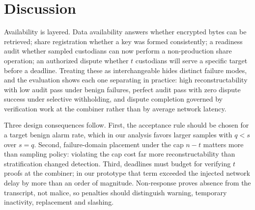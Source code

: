 \documentclass[10pt]{article}
\makeatletter
\newcommand{\FloatBarrier}{\par\begingroup\let\@elt\relax\edef\@tempa{\@botlist\@deferlist\@dbldeferlist}\ifx\@tempa\@empty\else\clearpage\fi\endgroup}
\makeatother
\begin{document}
\begin{table}[!htbp]
\centering
\caption{Scalability with $t=n-\lfloor(n-1)/3\rfloor$. Detection is exact (Eq.~\eqref{eq:bound}, $q=s$). Audit CPU is $s$ proofs plus $s$ verifications; bytes are one request plus $s$ responses. Dispute time is measured verification of $t$ partials plus combination.}
\label{tab:scalability}
\small

\end{table}

\begin{table}[!htbp]
\centering
\caption{Median wall time per operation, CPython 3.13 on an Apple M4 Pro; RFC~7919 groups \citep{rfc7919} with $q=(p-1)/2$ and generator~4. Pure-Python reference implementation.}
\label{tab:operations}
\small

\end{table}

\begin{table}[!htbp]
\centering
\caption{Bulletin-board gas per operation, re-measured for this revision with Foundry 1.5.1 and Solidity 0.8.24 (test-body gas; fixture setup excluded). Each operation was measured in the small harness committee named in the scope column; values are deterministic and identical to the earlier snapshot.}
\label{tab:gas}
\small

\end{table}

\FloatBarrier
\section{Discussion}

Availability is layered. Data availability answers whether encrypted bytes can be retrieved; share registration whether a key was formed consistently; a readiness audit whether sampled custodians can now perform a non-production share operation; an authorized dispute whether $t$ custodians will serve a specific target before a deadline. Treating these as interchangeable hides distinct failure modes, and the evaluation shows each one separating in practice: high reconstructability with low audit pass under benign failures, perfect audit pass with zero dispute success under selective withholding, and dispute completion governed by verification work at the combiner rather than by average network latency.

Three design consequences follow. First, the acceptance rule should be chosen for a target benign alarm rate, which in our analysis favors larger samples with $q<s$ over $s=q$. Second, failure-domain placement under the cap $n-t$ matters more than sampling policy: violating the cap cost far more reconstructability than stratification changed detection. Third, deadlines must budget for verifying $t$ proofs at the combiner; in our prototype that term exceeded the injected network delay by more than an order of magnitude. Non-response proves absence from the transcript, not malice, so penalties should distinguish warning, temporary inactivity, replacement and slashing.
\end{document}

